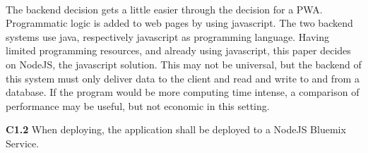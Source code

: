 \paragraph{} The backend decision gets a little easier through the decision for a PWA. Programmatic logic is added to web pages by using javascript. The two backend systems use java, respectively javascript as programming language. Having limited programming resources, and already using javascript, this paper decides on NodeJS, the javascript solution. This may not be universal, but the backend of this system must only deliver data to the client and read and write to and from a database. If the program would be more computing time intense, a comparison of performance may be useful, but not economic in this setting.
\begin{closeItem}
      \item [\textbf{C1.2}] When deploying, the application shall be deployed to a NodeJS Bluemix Service.
\end{closeItem}
